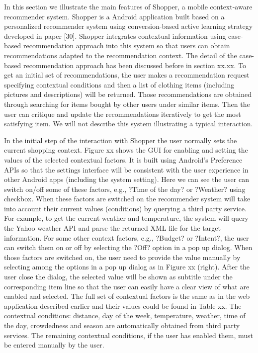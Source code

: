 In this section we illustrate the main features of Shopper, a mobile context-aware recommender system. Shopper is a Android application built based on a personalized recommender system using conversion-based active learning strategy developed in paper [30]. Shopper integrates contextual information using case-based recommendation approach into this system so that users can obtain recommendations adapted to the recommendation context. The detail of the case-based recommendation approach has been discussed before in section xx.xx. To get an initial set of recommendations, the user makes a recommendation request specifying contextual conditions and then a list of clothing items (including pictures and descriptions) will be returned. Those recommendations are obtained through searching for items bought by other users under similar items. Then the user can critique and update the recommendations iteratively to get the most satisfying item. We will not describe this system illustrating a typical interaction.

In the initial step of the interaction with Shopper the user normally sets the current shopping context. Figure xx shows the GUI for enabling and setting the values of the selected contextual factors. It is built using Android's Preference APIs so that the settings interface will be consistent with the user experience in other Android apps (including the system setting). Here we can see the user can switch on/off some of these factors, e.g., ?Time of the day?  or ?Weather? using checkbox. When these factors are switched on the recommender system will take into account their current values (conditions) by querying a third party service. For example, to get the current weather and temperature, the system will query the Yahoo weather API and parse the returned XML file for the target information. For some other context factors, e.g., ?Budget? or ?Intent?, the user can switch them on or off by selecting the ?Off? option in a pop up dialog. When those factors are switched on, the user need to provide the value manually by selecting among the options in a pop up dialog as in Figure xx (right). After the user close the dialog, the selected value will be shown as subtitle under the corresponding item line so that the user can easily have a clear view of what are enabled and selected. The full set of contextual factors is the same as in the web application described earlier and their values could be found in Table xx. The contextual conditions: distance, day of the week, temperature, weather, time of the day, crowdedness and season are automatically obtained from third party services. The remaining contextual conditions, if the user has enabled them, must be entered manually by the user.

